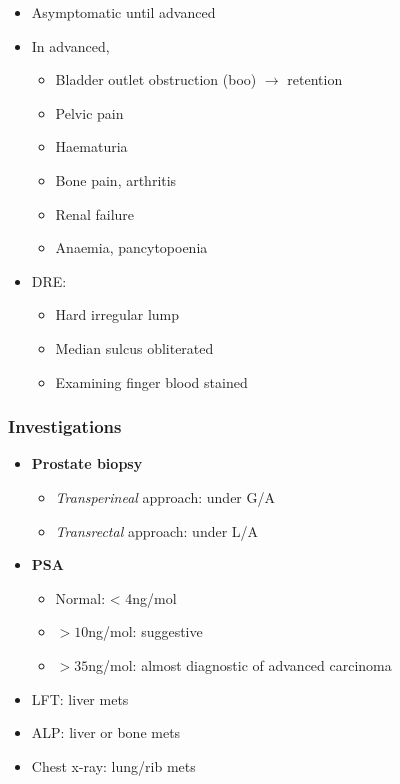 \documentclass[
  14pt,
]{extarticle}
\providecommand{\tightlist}{%
  \setlength{\itemsep}{0pt}\setlength{\parskip}{0pt}}
\begin{document}
\begin{itemize}
\tightlist
\item
  Asymptomatic until advanced
\item
  In advanced,

  \begin{itemize}
  \tightlist
  \item
    Bladder outlet obstruction (boo) \(\rightarrow\) retention
  \item
    Pelvic pain
  \item
    Haematuria
  \item
    Bone pain, arthritis
  \item
    Renal failure
  \item
    Anaemia, pancytopoenia
  \end{itemize}
\item
  DRE:

  \begin{itemize}
  \tightlist
  \item
    Hard irregular lump
  \item
    Median sulcus obliterated
  \item
    Examining finger blood stained
  \end{itemize}
\end{itemize}

\hypertarget{investigations-6}{%
\subsubsection{Investigations}\label{investigations-6}}

\begin{itemize}
\tightlist
\item
  \textbf{Prostate biopsy}

  \begin{itemize}
  \tightlist
  \item
    \emph{Transperineal} approach: under G/A
  \item
    \emph{Transrectal} approach: under L/A
  \end{itemize}
\item
  \textbf{PSA}

  \begin{itemize}
  \tightlist
  \item
    Normal: \textless{} 4ng/mol
  \item
    \(>10\)ng/mol: suggestive
  \item
    \(>35\)ng/mol: almost diagnostic of advanced carcinoma
  \end{itemize}
\item
  LFT: liver mets
\item
  ALP: liver or bone mets
\item
  Chest x-ray: lung/rib mets
\end{itemize}
\end{document}
